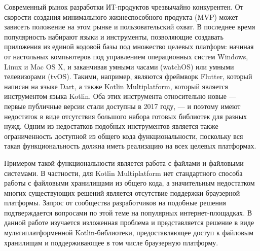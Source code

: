 


Современный рынок разработки ИТ-продуктов чрезвычайно конкурентен. От скорости создания  минимального жизнеспособного продукта (MVP) может зависеть положение на этом рынке и пользовательский охват. В последнее время популярность набирают языки и инструменты, позволяющие создавать приложения из единой кодовой базы под множество целевых платформ: начиная от настольных компьютеров под управлением операционных систем Windows, Linux и Mac OS X, и заканчивая умными часами (watchOS) или умными телевизорами (tvOS). Такими, например, являются фреймворк Flutter, который написан на языке Dart, а также Kotlin Multiplatform, который является инструментом языка Kotlin. Оба этих инструмента относительно новые --- первые публичные версии стали доступны в 2017 году, --- и поэтому имеют недостаток в виде отсутствия большого набора готовых библиотек для разных нужд. Одним из недостатков подобных инструментов является также ограниченность доступной из общего кода функциональности, поскольку вся такая функциональность должна иметь реализацию на всех целевых платформах.

Примером такой функциональности является работа с файлами и файловыми системами. В частности, для Kotlin Multiplatform нет стандартного способа работы с файловыми хранилищами из общего кода, а значительным недостатком многих существующих решений является отсутствие поддержки браузерной платформы. Запрос от сообщества разработчиков на подобные решения подтверждается вопросами по этой теме на популярных интернет-площадках\cite{so-file-io-with-kotlin-multiplatform, so-read-write-file-in-kotlin-native-ios-side, reddit-multiplatform-file-io, reddit-kotlin-native-library-io, kotlinlang-multiplatform-file-interaction}. В данной работе изучается изложенная проблема и представляется решение в виде мультиплатформенной Kotlin-библиотеки, предоставляющее доступ к файловым хранилищам и поддерживающее в том числе браузерную платформу.


